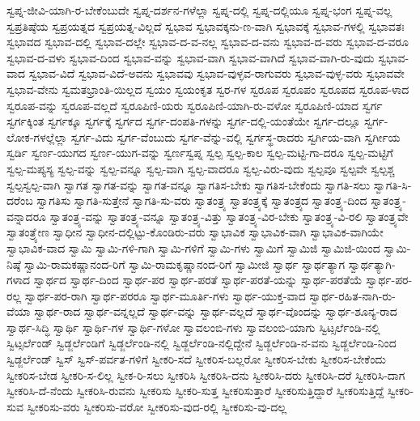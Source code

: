 {ಸ್ವಪ್ನ-ಜೀವಿ-ಯಾಗಿ-ರ-ಬೇಕೆಂಬುದೇ
ಸ್ವಪ್ನ-ದರ್ಶನ-ಗಳೆಲ್ಲಾ
ಸ್ವಪ್ನ-ದಲ್ಲಿ
ಸ್ವಪ್ನ-ದಲ್ಲಿಯೂ
ಸ್ವಪ್ನ-ಭಂಗ
ಸ್ವಪ್ನ-ವಲ್ಲ
ಸ್ವಪ್ರತಿಷ್ಠೆಯ
ಸ್ವಪ್ರಯತ್ನದ
ಸ್ವಪ್ರಯತ್ನ-ವಿಲ್ಲದೆ
ಸ್ವಭಾವ
ಸ್ವಭಾವಕ್ಕನು-ಣ-ವಾಗಿ
ಸ್ವಭಾವಕ್ಕೆ
ಸ್ವಭಾವ-ಗಳಲ್ಲಿ
ಸ್ವಭಾವತಃ
ಸ್ವಭಾವದ
ಸ್ವಭಾವ-ದಲ್ಲಿ
ಸ್ವಭಾವ-ದಲ್ಲೇ
ಸ್ವಭಾವ-ದ-ವ-ನಲ್ಲ
ಸ್ವಭಾವ-ದ-ವನು
ಸ್ವಭಾವ-ದ-ವರು
ಸ್ವಭಾವ-ದ-ವರೂ
ಸ್ವಭಾವ-ದ-ವಳು
ಸ್ವಭಾವ-ದಿಂದ
ಸ್ವಭಾವ-ವನ್ನು
ಸ್ವಭಾವ-ವಾಗಿ
ಸ್ವಭಾವ-ವಾಗಿದೆ
ಸ್ವಭಾವ-ವಾಗಿ-ರು-ವುದು
ಸ್ವಭಾವ-ವಾದ
ಸ್ವಭಾವ-ವಿದೆ
ಸ್ವಭಾವ-ವಿದೆ-ಅವನು
ಸ್ವಭಾವವು
ಸ್ವಭಾವ-ವುಳ್ಳವ-ರಾಗುವರು
ಸ್ವಭಾವ-ವುಳ್ಳ-ವರು
ಸ್ವಭಾವವೇ
ಸ್ವಭಾವ-ವೇನು
ಸ್ವಮತಭ್ರಾಂತಿ-ಯಿಲ್ಲದ
ಸ್ವಯಂ
ಸ್ವಯಂಕೃತ
ಸ್ವರ-ಗಳ
ಸ್ವರೂಪ
ಸ್ವರೂಪಂ
ಸ್ವರೂಪದ
ಸ್ವರೂಪ-ಳಾದ
ಸ್ವರೂಪ-ವನ್ನು
ಸ್ವರೂಪ-ವಲ್ಲದೆ
ಸ್ವರೂಪಿಣಿ-ಯರು
ಸ್ವರೂಪಿಣಿ-ಯಾಗಿ-ರು-ವಳೋ
ಸ್ವರೂಪಿಣಿ-ಯಾದ
ಸ್ವರ್ಗ
ಸ್ವರ್ಗಕ್ಕಿಂತ
ಸ್ವರ್ಗಕ್ಕೂ
ಸ್ವರ್ಗಕ್ಕೆ
ಸ್ವರ್ಗದ
ಸ್ವರ್ಗ-ದಂಪತಿ-ಗಳನ್ನು
ಸ್ವರ್ಗ-ದಲ್ಲಿ-ಯಂತೆಯೇ
ಸ್ವರ್ಗ-ದಲ್ಲೂ
ಸ್ವರ್ಗ-ಲೋಕ-ಗಳಲ್ಲೆಲ್ಲಾ
ಸ್ವರ್ಗ-ವಿದು
ಸ್ವರ್ಗ-ವೆಂಬುದು
ಸ್ವರ್ಗ-ವೆನ್ನು-ವಲ್ಲಿ
ಸ್ವರ್ಗಸ್ಥ-ರಾದರು
ಸ್ವರ್ಗಿಯ-ವಾಗಿ
ಸ್ವರ್ಗೀಯ
ಸ್ವರ್ಡಿ
ಸ್ವರ್ಣ-ಯುಗದ
ಸ್ವರ್ಣ-ಯುಗ-ವನ್ನು
ಸ್ವರ್ಣಸ್ವಪ್ನ
ಸ್ವಲ್ಪ
ಸ್ವಲ್ಪ-ಕಾಲ
ಸ್ವಲ್ಪ-ಮಟ್ಟಿ-ಗಾ-ದರೂ
ಸ್ವಲ್ಪ-ಮಟ್ಟಿಗೆ
ಸ್ವಲ್ಪ-ಮಪ್ಯಸ್ಯ
ಸ್ವಲ್ಪ-ವನ್ನು
ಸ್ವಲ್ಪ-ವನ್ನೂ
ಸ್ವಲ್ಪ-ವಾಗಿ
ಸ್ವಲ್ಪ-ವಾದರೂ
ಸ್ವಲ್ಪ-ವಿರು-ವುದು
ಸ್ವಲ್ಪವೂ
ಸ್ವಲ್ಪವೇ
ಸ್ವಲ್ಪಶ್ಚ
ಸ್ವಲ್ಪಸ್ವಲ್ಪ-ವಾಗಿ
ಸ್ವಾಗತ
ಸ್ವಾಗತ-ವನ್ನು
ಸ್ವಾಗತ-ವನ್ನೂ
ಸ್ವಾಗತಿಸ-ಬೇಕು
ಸ್ವಾಗತಿಸ-ಬೇಕೆಂದು
ಸ್ವಾಗತಿ-ಸಲು
ಸ್ವಾಗತಿ-ಸಿ-ದರೆಂಬ
ಸ್ವಾಗತಿಸು
ಸ್ವಾಗತಿ-ಸುತ್ತೇನೆ
ಸ್ವಾಗತಿ-ಸು-ವರು
ಸ್ವಾತಂತ್ರ್ಯ
ಸ್ವಾತಂತ್ರ್ಯಕ್ಕೆ
ಸ್ವಾತಂತ್ರ್ಯದ
ಸ್ವಾತಂತ್ರ್ಯ-ದಿಂದ
ಸ್ವಾತಂತ್ರ್ಯ-ವನ್ನಾದರೂ
ಸ್ವಾತಂತ್ರ್ಯ-ವನ್ನು
ಸ್ವಾತಂತ್ರ್ಯ-ವನ್ನೂ
ಸ್ವಾತಂತ್ರ್ಯ-ವಿತ್ತು
ಸ್ವಾತಂತ್ರ್ಯ-ವಿರ-ಬೇಕು
ಸ್ವಾತಂತ್ರ್ಯ-ವಿ-ರಲಿ
ಸ್ವಾತಂತ್ರ್ಯವೇ
ಸ್ವಾತಂತ್ರ್ಯೇಣ
ಸ್ವಾಧೀನ
ಸ್ವಾಧೀನ-ದಲ್ಲಿಟ್ಟು-ಕೊಂಡಿರು-ವರು
ಸ್ವಾಭಾವಿಕ
ಸ್ವಾಭಾವಿಕ-ವಾಗಿ
ಸ್ವಾಭಾವಿಕ-ವಾಗಿಯೇ
ಸ್ವಾಭಾವಿಕ-ವಾದ
ಸ್ವಾಮಿ
ಸ್ವಾಮಿ-ಗಳಿ-ಗಾಗಿ
ಸ್ವಾಮಿ-ಗಳಿಗೆ
ಸ್ವಾಮಿ-ಗಳು
ಸ್ವಾಮಿಗೆ
ಸ್ವಾಮಿಜಿ
ಸ್ವಾಮಿಜಿ-ಯಿಂದ
ಸ್ವಾಮಿ-ನಿಷ್ಠೆ
ಸ್ವಾಮಿ-ರಾಮಕಷ್ಣಾನಂದ-ರಿಗೆ
ಸ್ವಾಮಿ-ರಾಮಕೃಷ್ಣಾನಂದ-ರಿಗೆ
ಸ್ವಾಮೀಜಿ
ಸ್ವಾರ್ಥ
ಸ್ವಾರ್ಥತ್ಯಾಗ
ಸ್ವಾರ್ಥತ್ಯಾಗಿ-ಗಳಾದ
ಸ್ವಾರ್ಥದ
ಸ್ವಾರ್ಥ-ದಿಂದ
ಸ್ವಾರ್ಥ-ಪರ
ಸ್ವಾರ್ಥ-ಪರತೆ
ಸ್ವಾರ್ಥ-ಪರತೆ-ಯನ್ನು
ಸ್ವಾರ್ಥ-ಪರತೆಯೆ
ಸ್ವಾರ್ಥ-ಪರ-ರಲ್ಲ
ಸ್ವಾರ್ಥ-ಪರ-ರಾಗಿ
ಸ್ವಾರ್ಥ-ಪರರೂ
ಸ್ವಾರ್ಥ-ಮೂರ್ತಿ-ಗಳು
ಸ್ವಾರ್ಥ-ಯುಕ್ತ-ವಾದ
ಸ್ವಾರ್ಥ-ರಹಿತ-ನಾಗಿ-ರು-ವೆಯಾ
ಸ್ವಾರ್ಥ-ರಾದ
ಸ್ವಾರ್ಥ-ವನ್ನಲ್ಲದೆ
ಸ್ವಾರ್ಥ-ವನ್ನು
ಸ್ವಾರ್ಥ-ವಲ್ಲದೆ
ಸ್ವಾರ್ಥ-ವೊಂದನ್ನು
ಸ್ವಾರ್ಥ-ಶೂನ್ಯ-ರಾದ
ಸ್ವಾರ್ಥ-ಸಿದ್ಧಿ
ಸ್ವಾರ್ಥಿ
ಸ್ವಾರ್ಥಿ-ಗಳ
ಸ್ವಾರ್ಥಿ-ಗಳೋ
ಸ್ವಾವಲಂಬಿ-ಗಳು
ಸ್ವಾವಲಂಬಿ-ಯಾಗು
ಸ್ವಿಟ್ಸರ್ಲೆಂಡಿ-ನಲ್ಲಿ
ಸ್ವಿಟ್ಸರ್ಲೆಂಡ್
ಸ್ವಿಡ್ಜರ್ಲೆಂಡಿಗೆ
ಸ್ವಿಡ್ಜರ್ಲೆಂಡಿ-ನಲ್ಲಿ
ಸ್ವಿಡ್ಜರ್ಲೆಂಡಿ-ನಲ್ಲಿದ್ದೇನೆ
ಸ್ವಿಡ್ಜರ್ಲೆಂಡಿ-ನ-ವನು
ಸ್ವಿಡ್ಜರ್ಲೆಂಡಿ-ನಿಂದ
ಸ್ವಿಡ್ಜರ್ಲೆಂಡ್
ಸ್ವಿಸ್
ಸ್ವಿಸ್-ಪರ್ವತ-ಗಳಿಗೆ
ಸ್ವೀಕರಿ-ಸದೆ
ಸ್ವೀಕರಿಸ-ಬಲ್ಲರೋ
ಸ್ವೀಕರಿಸ-ಬೇಕು
ಸ್ವೀಕರಿಸ-ಬೇಕೆಂದು
ಸ್ವೀಕರಿಸ-ಬೇಡ
ಸ್ವೀಕರಿ-ಸ-ಲಿಲ್ಲ
ಸ್ವೀಕ-ರಿ-ಸಲು
ಸ್ವೀಕರಿಸಿ
ಸ್ವೀಕರಿಸಿ-ದನು
ಸ್ವೀಕರಿಸಿ-ದರು
ಸ್ವೀಕರಿಸಿ-ದರೆ
ಸ್ವೀಕರಿಸಿ-ದಾಗ
ಸ್ವೀಕರಿಸಿ-ದೆ-ನೆಂದು
ಸ್ವೀಕರಿಸಿ-ರುವನು
ಸ್ವೀಕರಿಸು
ಸ್ವೀಕರಿ-ಸುತ್ತ
ಸ್ವೀಕರಿಸುತ್ತಾರೆ
ಸ್ವೀಕರಿಸುತ್ತಿದ್ದಾರೆ
ಸ್ವೀಕರಿಸುತ್ತಿದ್ದೆ
ಸ್ವೀಕರಿ-ಸುವ
ಸ್ವೀಕರಿಸು-ವರು
ಸ್ವೀಕರಿಸು-ವರೋ
ಸ್ವೀಕರಿಸು-ವುದ-ರಲ್ಲಿ
ಸ್ವೀಕರಿಸು-ವು-ದಲ್ಲ
}
